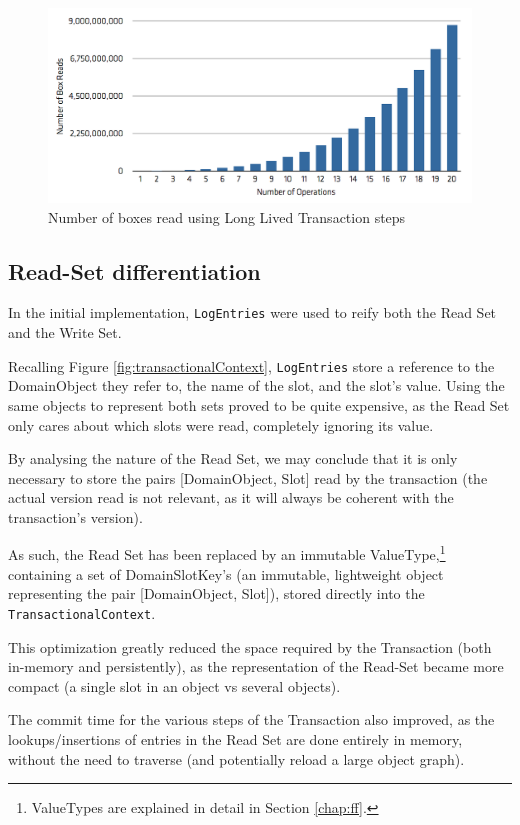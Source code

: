 \documentclass{llncs}
\begin{document}
\begin{figure}
\centering
\includegraphics[width=0.9\linewidth]{box-long-v1}
\caption{Number of boxes read using Long Lived Transaction steps}
\label{fig:long-box-v1}
\end{figure}

\subsection{Read-Set differentiation}

In the initial implementation, \texttt{LogEntries} were used to reify
both the Read Set and the Write Set.

Recalling Figure \ref{fig:transactionalContext}, \texttt{LogEntries}
store a reference to the DomainObject they refer to, the name of the
slot, and the slot's value. Using the same objects to represent both
sets proved to be quite expensive, as the Read Set only cares about
which slots were read, completely ignoring its value.

By analysing the nature of the Read Set, we may conclude that it is
only necessary to store the pairs [DomainObject, Slot] read by the
transaction (the actual version read is not relevant, as it will
always be coherent with the transaction's version).

As such, the Read Set has been replaced by an immutable
ValueType,\footnote{ValueTypes are explained in detail in Section
  \ref{chap:ff}.} containing a set of DomainSlotKey's (an immutable,
lightweight object representing the pair [DomainObject, Slot]), stored
directly into the \texttt{TransactionalContext}.

This optimization greatly reduced the space required by the
Transaction (both in-memory and persistently), as the representation
of the Read-Set became more compact (a single slot in an object vs
several objects).

The commit time for the various steps of the Transaction also
improved, as the lookups/insertions of entries in the Read Set are
done entirely in memory, without the need to traverse (and
potentially reload a large object graph).
\end{document}
